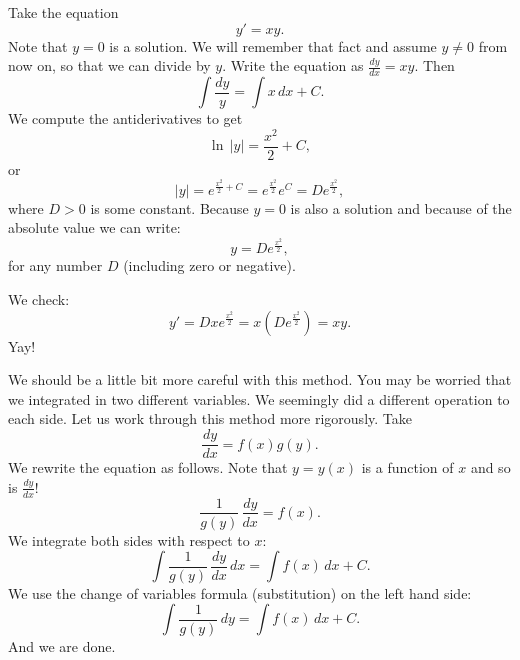 \begin{example} \label{example:yprimeisxy}
Take the equation
\begin{equation*}
y' = xy .
\end{equation*}
Note that $y=0$ is a solution.  We will remember that fact and
assume $y \not =0$ from now on, so that we can divide by $y$.
Write the equation as $\frac{dy}{dx} = xy$. Then
\begin{equation*}
\int \frac{dy}{y} = \int x\,dx + C .
\end{equation*}
We compute the antiderivatives to get
\begin{equation*}
\ln \, \lvert y\rvert = \frac{x^2}{2} + C ,
\end{equation*}
or
\begin{equation*}
\lvert y \rvert = e^{\frac{x^2}{2} + C} = e^{\frac{x^2}{2}} e^C = D e^{\frac{x^2}{2}} ,
\end{equation*}
where $D > 0$ is some constant.  Because $y=0$ is also a solution and because
of the absolute value we can write:
\begin{equation*}
y = D e^{\frac{x^2}{2}} ,
\end{equation*}
for any number $D$ (including zero or negative).

We check:
\begin{equation*}
y' = D x e^{\frac{x^2}{2}} = x \left( D e^{\frac{x^2}{2}} \right) = xy .
\end{equation*}
Yay!
\end{example}

We should be a little bit more careful with this method.  You may be worried 
that we 
integrated in two different variables.
We seemingly did
a different operation to each side.  Let us work through this method more
rigorously.  Take
\begin{equation*}
\frac{dy}{dx} = f(x)g(y) .
\end{equation*}
We rewrite the equation as follows.
Note that $y = y(x)$ is a function of $x$ and so is
$\frac{dy}{dx}$!
\begin{equation*}
\frac{1}{g(y)}\,\frac{dy}{dx} = f(x) .
\end{equation*}
We integrate both sides with respect to $x$:
\begin{equation*}
\int \frac{1}{g(y)}\,\frac{dy}{dx} \,dx = \int f(x) \,dx + C .
\end{equation*}
We use the change of variables formula (substitution) on the left hand side:
\begin{equation*}
\int \frac{1}{g(y)}\,dy = \int f(x) \,dx + C .
\end{equation*}
And we are done.

